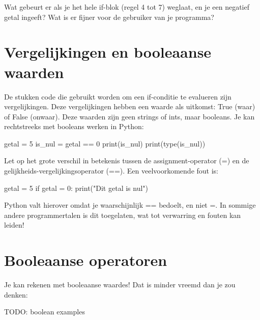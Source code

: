 \documentclass[10pt,a4paper]{article}
\newenvironment{task}{\smallpencil}{}
\begin{document}
\begin{task}
Wat gebeurt er als je het hele if-blok (regel 4 tot 7) weglaat, en je een negatief getal ingeeft? Wat is er fijner voor de gebruiker van je programma?
\end{task}

\section{Vergelijkingen en booleaanse waarden}
De stukken code die gebruikt worden om een if-conditie te evalueren zijn vergelijkingen. Deze vergelijkingen hebben een waarde als uitkomst: True (waar) of False (onwaar). Deze waarden zijn geen strings of ints, maar booleans. Je kan rechtstreeks met booleans werken in Python:
\begin{python}
getal = 5
is_nul = getal == 0
print(is_nul)
print(type(is_nul))
\end{python}

Let op het grote verschil in betekenis tussen de assignment-operator (=) en de gelijkheids-vergelijkingsoperator (==). Een veelvoorkomende fout is:
\begin{python}
getal = 5
if getal = 0:
    print("Dit getal is nul")
\end{python}
Python valt hierover omdat je waarschijnlijk == bedoelt, en niet =. In sommige andere programmertalen is dit toegelaten, wat tot verwarring en fouten kan leiden!

\section{Booleaanse operatoren}
Je kan rekenen met booleaanse waardes! Dat is minder vreemd dan je zou denken:

TODO: boolean examples
\end{document}
